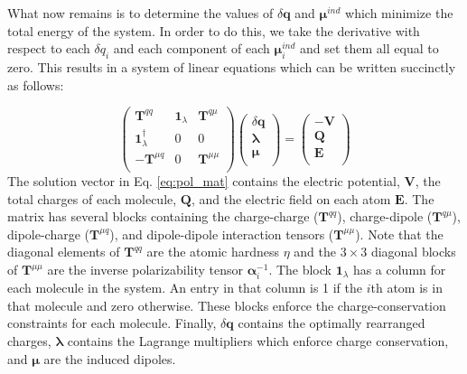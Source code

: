 \documentclass[journal=jctcce,manuscript=article]{achemso}
\begin{document}

What now remains is to determine the values of $\delta \bm{q}$ and $\bm{\mu}^{ind}$
which minimize the total energy of the system. In order to do this, we take
the derivative with respect to each $\delta q_i$ and each component of each
$\bm{\mu}_i^{ind}$ and set them all equal to zero. This results in a system of linear
equations which can be written succinctly as follows:

\begin{equation}
  \begin{pmatrix}
    \bm{T}^{qq} & \bm{1}_\lambda & \bm{T}^{q\mu} \\
    \bm{1}_\lambda^\dagger & 0 & 0 \\
    -\bm{T}^{\mu q} & 0 & \bm{T}^{\mu\mu} \\
  \end{pmatrix}
  \begin{pmatrix}
    \delta \bm{q} \\
    \bm{\lambda} \\
    \bm{\mu} \\
  \end{pmatrix}
  =
  \begin{pmatrix}
    -\bm{V} \\
    \bm{Q} \\
    \bm{E} \\
  \end{pmatrix}
  \label{eq:pol_mat}
\end{equation}
The solution vector in Eq. \ref{eq:pol_mat} contains the electric potential,
$\bm{V}$, the total charges of each molecule, $\bm{Q}$, and the electric
field on each atom $\bm{E}$. The matrix has several blocks containing the
charge-charge ($\bm{T}^{qq}$), charge-dipole ($\bm{T}^{q\mu}$),
dipole-charge ($\bm{T}^{\mu q}$), and dipole-dipole interaction tensors ($\bm{T}^{\mu\mu}$).
Note that the diagonal elements of $\bm{T}^{qq}$ are the atomic hardness $\eta$ and
the $3\times 3$ diagonal blocks of $\bm{T}^{\mu\mu}$ are the inverse polarizability tensor
$\bm{\alpha}_i^{-1}$. The block $\bm{1}_\lambda$ has a column for each molecule in the system.
An entry in that column is 1 if the $i$th atom is in that molecule and zero otherwise.
These blocks enforce the charge-conservation constraints for each molecule.
Finally, $\delta\bm{q}$ contains the optimally rearranged charges, $\bm{\lambda}$ contains
the Lagrange multipliers which enforce charge conservation, and $\bm{\mu}$ are the induced dipoles.
\end{document}
